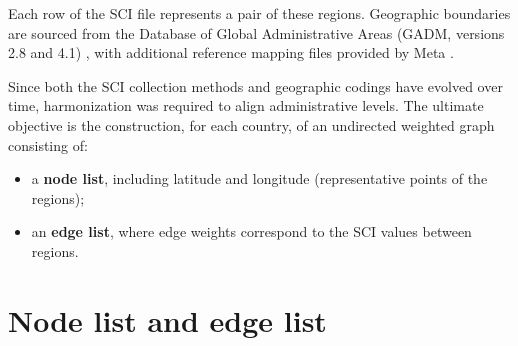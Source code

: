 Each row of the SCI file represents a pair of these regions. Geographic boundaries are sourced from the Database of Global Administrative Areas (GADM, versions 2.8 and 4.1) \cite{gadm}, with additional reference mapping files provided by Meta \cite{gadm1nuts2csv}.  

Since both the SCI collection methods and geographic codings have evolved over time, harmonization was required to align administrative levels.  
The ultimate objective is the construction, for each country, of an undirected weighted graph consisting of:  
\begin{itemize}
    \item a \textbf{node list}, including latitude and longitude (representative points of the regions);  
    \item an \textbf{edge list}, where edge weights correspond to the SCI values between regions.  
\end{itemize}

\section{Node list and edge list}

